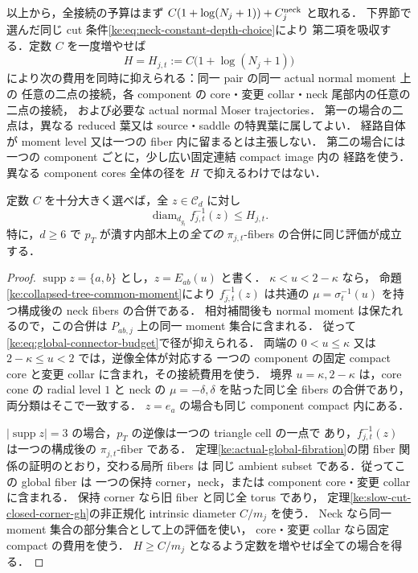 以上から，全接続の予算はまず
$C(1+\log(N_j+1))+C_j^{\rm neck}$ と取れる．
下界節で選んだ同じ cut 条件\eqref{ke:eq:neck-constant-depth-choice}により
第二項を吸収する．定数 $C$ を一度増やせば
\begin{equation}\label{ke:eq:global-connector-budget}
 H=H_{j,t}:=C\bigl(1+\log(N_j+1)\bigr)
\end{equation}
により次の費用を同時に抑えられる：同一 pair の同一 actual normal moment 上の
任意の二点の接続，各 component の core・変更 collar・neck 尾部内の任意の二点の接続，
および必要な actual normal Moser trajectories．
第一の場合の二点は，異なる reduced 葉又は source・saddle の特異葉に属してよい．
経路自体が moment level 又は一つの fiber 内に留まるとは主張しない．
第二の場合には一つの component ごとに，少し広い固定連結 compact image 内の
経路を使う．異なる component cores 全体の径を $H$ で抑えるわけではない．

\begin{proposition}
\label{ke:collapsed-tree-full-fiber-collapse}
定数 $C$ を十分大きく選べば，全 $z\in\mathcal C_d$ に対し
\begin{equation}\label{ke:eq:full-fiber-diameter-upper}
 \operatorname{diam}_{d_{g_t}} f_{j,t}^{-1}(z)\le H_{j,t}.
\end{equation}
特に，$d\ge6$ で $p_T$ が潰す内部木上の\emph{全ての}
$\pi_{j,t}$-fibers の合併に同じ評価が成立する．
\end{proposition}

\begin{proof}
$\operatorname{supp}z=\{a,b\}$ とし，$z=E_{ab}(u)$ と書く．
$\kappa<u<2-\kappa$ なら，
命題\ref{ke:collapsed-tree-common-moment}により
$f_{j,t}^{-1}(z)$ は共通の
$\mu=\sigma_t^{-1}(u)$ を持つ構成後の neck fibers の合併である．
相対補間後も normal moment は保たれるので，この合併は
$P_{ab,j}$ 上の同一 moment 集合に含まれる．
従って\eqref{ke:eq:global-connector-budget}で径が抑えられる．
両端の $0<u\le\kappa$ 又は $2-\kappa\le u<2$ では，逆像全体が対応する
一つの component の固定 compact core と変更 collar に含まれ，その接続費用を使う．
境界 $u=\kappa,2-\kappa$ は，core cone の radial level $1$ と neck の
$\mu=-\delta,\delta$ を貼った同じ全 fibers の合併であり，両分類はそこで一致する．
$z=e_a$ の場合も同じ component compact 内にある．

$|\operatorname{supp}z|=3$ の場合，$p_T$ の逆像は一つの triangle cell の一点で
あり，$f_{j,t}^{-1}(z)$ は一つの構成後の $\pi_{j,t}$-fiber である．
定理\ref{ke:actual-global-fibration}の閉 fiber 関係の証明のとおり，交わる局所 fibers は
同じ ambient subset である．従ってこの global fiber は
一つの保持 corner，neck，または component core・変更 collar に含まれる．
保持 corner なら旧 fiber と同じ全 torus であり，
定理\ref{ke:slow-cut-closed-corner-gh}の非正規化 intrinsic diameter $C/m_j$ を使う．
Neck なら同一 moment 集合の部分集合として上の評価を使い，
core・変更 collar なら固定 compact の費用を使う．
$H\ge C/m_j$ となるよう定数を増やせば全ての場合を得る．
\end{proof}

